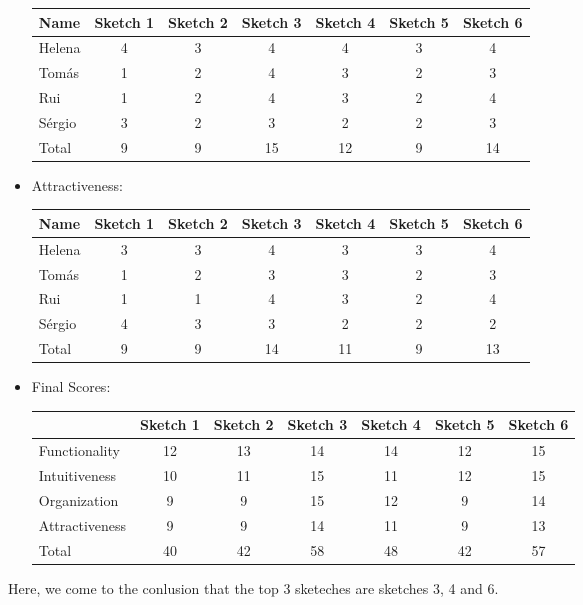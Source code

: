 \begin{itemize}
\begin{table}[H]
        \begin{tabular}{l*{6}{c}}
            Name & Sketch 1 & Sketch 2 & Sketch 3 & Sketch 4 & Sketch 5 & Sketch 6 \\
            \hline 
            Helena & 4 & 3 & 4 & 4 & 3 & 4 \\
            Tomás & 1 & 2 & 4 & 3 & 2 & 3 \\ 
            Rui & 1 & 2 & 4 & 3 & 2 & 4 \\ 
            Sérgio & 3 & 2 & 3 & 2 & 2 & 3 \\ 
            \hline
            Total & 9 & 9 & 15 & 12 & 9 & 14 \\
        \end{tabular}
        \end{table}
    \item Attractiveness:
    \begin{table}[H]
        \begin{tabular}{l*{6}{c}}
            Name & Sketch 1 & Sketch 2 & Sketch 3 & Sketch 4 & Sketch 5 & Sketch 6 \\
            \hline 
            Helena & 3 & 3 & 4 & 3 & 3 & 4 \\
            Tomás & 1 & 2 & 3 & 3 & 2 & 3 \\ 
            Rui & 1 & 1 & 4 & 3 & 2 & 4 \\ 
            Sérgio & 4 & 3 & 3 & 2 & 2 & 2 \\ 
            \hline
            Total & 9 & 9 & 14 & 11 & 9 & 13 \\
        \end{tabular}
        \end{table}
    \item Final Scores: 
    \begin{table}[H]
        \begin{tabular}{l*{6}{c}}
            & Sketch 1 & Sketch 2 & Sketch 3 & Sketch 4 
            & Sketch 5 & Sketch 6 \\
            \hline 
            Functionality & 12 & 13 & 14 & 14 & 12 & 15  \\
            Intuitiveness & 10 & 11 & 15 & 11 & 12 & 15  \\ 
            Organization & 9 & 9 & 15 & 12 & 9 & 14  \\ 
            Attractiveness & 9 & 9 & 14 & 11 & 9 & 13  \\ 
            \hline
            Total & 40 & 42 & 58 & 48 & 42 & 57  \\
        \end{tabular}
    \end{table}
\end{itemize} \par
Here, we come to the conlusion that the top 3 sketeches are
sketches 3, 4 and 6. 
